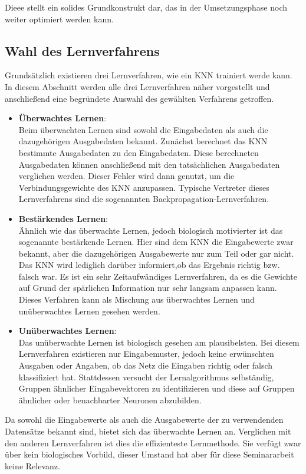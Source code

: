 Dieee stellt ein solides Grundkonstrukt dar, das in der Umsetzungsphase noch weiter optimiert werden kann.

\subsection{Wahl des Lernverfahrens} 
\label{subsection:Wahl des Lernverfahrens}

Grundsätzlich existieren drei Lernverfahren, wie ein KNN trainiert werde kann. In diesem Abschnitt werden alle drei Lernverfahren näher vorgestellt und anschließend eine begründete Auswahl des gewählten Verfahrens getroffen.

\begin{itemize}
\item \textbf{Überwachtes Lernen}: \\
Beim überwachten Lernen sind sowohl die Eingabedaten als auch die dazugehörigen Ausgabedaten bekannt. Zunächst berechnet das KNN bestimmte Ausgabedaten zu den Eingabedaten. Diese berechneten Ausgabedaten können anschließend mit den tatsächlichen Ausgabedaten verglichen werden. Dieser Fehler wird dann genutzt, um die Verbindungsgewichte des KNN anzupassen. Typische Vertreter dieses Lernverfahrens sind die sogenannten Backpropagation-Lernverfahren.
	
\item \textbf{Bestärkendes Lernen}: \\
Ähnlich wie das überwachte Lernen, jedoch biologisch motivierter ist das sogenannte bestärkende Lernen. Hier sind dem KNN die Eingabewerte zwar bekannt, aber die dazugehörigen Ausgabewerte nur zum Teil oder gar nicht. Das KNN wird lediglich darüber informiert,ob das Ergebnis richtig bzw. falsch war. Es ist ein sehr Zeitaufwändiges Lernverfahren, da es die Gewichte auf Grund der spärlichen Information nur sehr langsam anpassen kann. Dieses Verfahren kann als Mischung aus überwachtes Lernen und unüberwachtes Lernen gesehen werden.

\item \textbf{Unüberwachtes Lernen}: \\
Das unüberwachte Lernen ist biologisch gesehen am plausibelsten. Bei diesem  Lernverfahren existieren nur Eingabemuster, jedoch keine erwünschten Ausgaben oder Angaben, ob das Netz die Eingaben richtig oder falsch klassifiziert hat. Stattdessen versucht der Lernalgorithmus selbständig, Gruppen ähnlicher Eingabevektoren zu identifizieren und diese auf Gruppen ähnlicher oder benachbarter Neuronen abzubilden. 
\end{itemize}

Da sowohl die Eingabewerte als auch die Ausgabewerte der zu verwendenden Datensätze bekannt sind, bietet sich das überwachte Lernen an. Verglichen mit den anderen Lernverfahren ist dies die effizienteste Lernmethode. Sie verfügt zwar über kein biologisches Vorbild, dieser Umstand hat aber für diese Seminararbeit keine Relevanz.
